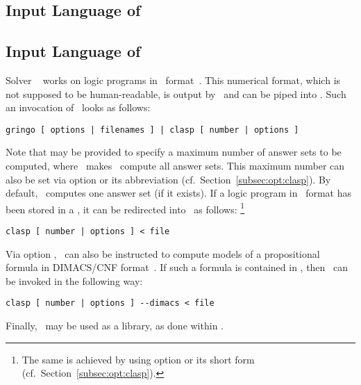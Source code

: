 \subsection{Input Language of \clingo}\label{subsec:lang:clingo}
%
\tbf
\subsection{Input Language of \clasp}\label{subsec:lang:clasp}

Solver \clasp~\cite{gekanesc07b} works on logic programs in \smodels\ format~\cite{lparseManual}.
This numerical format, which is not supposed to be human-readable,
is output by \gringo\ and can be piped into \clasp.
Such an invocation of \clasp\ looks as follows:
%
\begin{lstlisting}[numbers=none]
gringo [ options | filenames ] | clasp [ number | options ]
\end{lstlisting}
%
Note that  may be provided to specify a maximum number of answer sets
to be computed, where~ makes \clasp\ compute all answer sets.
This maximum number can also be set via
option  or its abbreviation 
(cf.\ Section~\ref{subsec:opt:clasp}).
By default, \clasp\ computes one answer set (if it exists).
If a logic program in \smodels\ format has been stored in a ,
it can be redirected into \clasp\ as follows:%
\footnote{%
  The same is achieved by using option  or its short form 
  (cf.\ Section~\ref{subsec:opt:clasp}).}
%
\begin{lstlisting}[numbers=none]
clasp [ number | options ] < file
\end{lstlisting}
%
Via option ,
\clasp\ can also be instructed to compute models of a propositional formula
in DIMACS/CNF format~\cite{dimacs}.
If such a formula is contained in ,
then \clasp\ can be invoked in the following way:
%
\begin{lstlisting}[numbers=none]
clasp [ number | options ] --dimacs < file
\end{lstlisting}
%
Finally, \clasp\ may be used as a library, as done within \clingo.
 
